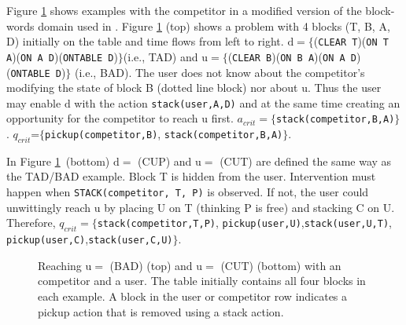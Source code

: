 \documentclass[letterpaper]{article}
\theoremstyle{plain}
\begin{document}
Figure \ref{fig:multi} shows examples with the competitor in a modified version of the block-words domain used in \cite{ramirez2009plan}.
Figure \ref{fig:multi} (top) shows a problem with 4 blocks (T, B, A, D) initially on the table and time flows from left to right. 
$\mathrm{d}=\lbrace$(\texttt{CLEAR T})(\texttt{ON T A})(\texttt{ON A D})(\texttt{ONTABLE D})$\rbrace$(i.e., TAD) and $\mathrm{u}=\lbrace$(\texttt{CLEAR B})(\texttt{ON B A})(\texttt{ON A D})(\texttt{ONTABLE D})$\rbrace$ (i.e., BAD).
The user does not know about the competitor's modifying the state of block B (dotted line block) nor about $\mathrm{u}$.
Thus the user may enable $\mathrm{d}$ with the action \texttt{stack(user,A,D)} and at the same time creating an opportunity for the competitor to reach $\mathrm{u}$ first. 
$a_{crit}=\lbrace$\texttt{stack(competitor,B,A)}$\rbrace$. 
$q_{crit}$=$\lbrace$\texttt{pickup(competitor,B)}, \texttt{stack(competitor,B,A)}$\rbrace$.

In Figure \ref{fig:multi}~(bottom) $\mathrm{d}= $ (CUP) and $\mathrm{u}= $ (CUT) are defined the same way as the TAD/BAD example. Block T is hidden from the user. Intervention must happen when \texttt{STACK(competitor, T, P)} is observed. If not, the user could unwittingly reach $\mathrm{u}$ by placing U on T (thinking P is free) and stacking C on U. 
Therefore, $q_{crit}=\lbrace$\texttt{stack(competitor,T,P)}, \texttt{pickup(user,U)},\texttt{stack(user,U,T)}, \texttt{pickup(user,C)},\texttt{stack(user,C,U)}$\rbrace$.

\begin{figure}[t]
        \caption{Reaching $\mathrm{u}= $ (BAD) (top) and $\mathrm{u}= $ (CUT) (bottom) with an competitor and a user.  The table initially contains all four blocks in each example. A block in the user or competitor row indicates a pickup action that is removed using a stack action.}
        \label{fig:multi}
\end{figure}
\end{document}

